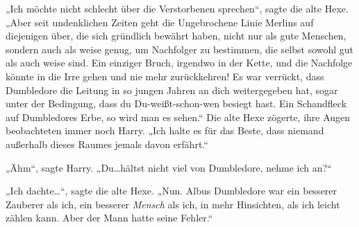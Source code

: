 „Ich möchte nicht schlecht über die Verstorbenen sprechen“, sagte die alte Hexe.
„Aber seit undenklichen Zeiten geht die Ungebrochene Linie Merlins auf diejenigen über, die sich gründlich bewährt haben, nicht nur als gute Menschen, sondern auch als weise genug, um Nachfolger zu bestimmen, die selbst sowohl gut als auch weise sind. Ein einziger Bruch, irgendwo in der Kette, und die Nachfolge könnte in die Irre gehen und nie mehr zurückkehren! Es war verrückt, dass Dumbledore die Leitung in so jungen Jahren an dich weitergegeben hat, sogar unter der Bedingung, dass du Du-weißt-schon-wen besiegt hast. Ein Schandfleck auf Dumbledores Erbe, so wird man es sehen.“
Die alte Hexe zögerte, ihre Augen beobachteten immer noch Harry.
„Ich halte es für das Beste, dass niemand außerhalb dieses Raumes jemals davon erfährt.“

„Ähm“, sagte Harry. „Du…hältst nicht viel von Dumbledore, nehme ich an?“

„Ich dachte…“, sagte die alte Hexe. „Nun. Albus Dumbledore war ein besserer Zauberer als ich, ein besserer \emph{Mensch} als ich, in mehr Hinsichten, als ich leicht zählen kann. Aber der Mann hatte seine Fehler.“

